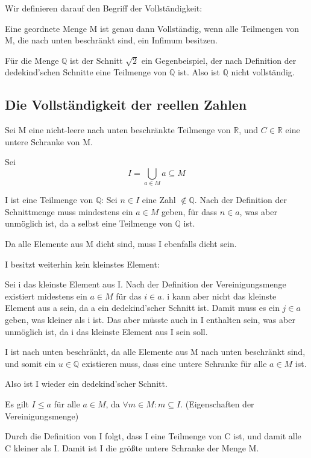 \documentclass[12pt]{article}
\begin{document}
    Wir definieren darauf den Begriff der Vollständigkeit:

    Eine geordnete Menge M ist genau dann Vollständig, wenn alle Teilmengen von M, die nach unten beschränkt sind,
    ein Infimum besitzen.

    Für die Menge $\mathbb{Q}$ ist der Schnitt $\sqrt{2}$ ein Gegenbeispiel, der nach Definition
    der dedekind'schen Schnitte eine Teilmenge von $\mathbb{Q}$ ist.
    Also ist $\mathbb{Q}$ nicht vollständig.

    \subsection{Die Vollständigkeit der reellen Zahlen}

    Sei M eine nicht-leere nach unten beschränkte Teilmenge von $\mathbb{R}$, und $C \in \mathbb{R}$ eine untere Schranke von M.

    Sei
    \[I = \bigcup \limits_{a \in M} a \subseteq M\]

    I ist eine Teilmenge von $\mathbb{Q}$:
    Sei $n \in I$ eine Zahl $\not \in \mathbb{Q}$. Nach der Definition der Schnittmenge muss mindestens ein
    $a \in M$ geben, für dass $n \in a$, was aber unmöglich ist, da a selbst eine Teilmenge von $\mathbb{Q}$ ist.

    Da alle Elemente aus M dicht sind, muss I ebenfalls dicht sein.  %

    I besitzt weiterhin kein kleinstes Element:

    Sei i das kleinste Element aus I.
    Nach der Definition der Vereinigungsmenge existiert midestens ein $a \in M$ für das $i \in a$.
    i kann aber nicht das kleinste Element aus a sein, da a ein dedekind'scher Schnitt ist.
    Damit muss es ein $j \in a$ geben, was kleiner als i ist. Das aber müsste auch in I enthalten sein,
    was aber unmöglich ist, da i das kleinste Element aus I sein soll.

    I ist nach unten beschränkt, da alle Elemente aus M nach unten beschränkt sind, und somit ein
    $u \in \mathbb{Q}$ existieren muss, dass eine untere Schranke für alle $a \in M$ ist.

    Also ist I wieder ein dedekind'scher Schnitt.

    Es gilt $I \le a$ für alle $a \in M$, da $\forall m \in M: m \subseteq I$. (Eigenschaften der Vereinigungsmenge)

    Durch die Definition von I folgt, dass I eine Teilmenge von C ist, und damit alle C kleiner als I.
    Damit ist I die größte untere Schranke der Menge M.
\end{document}
